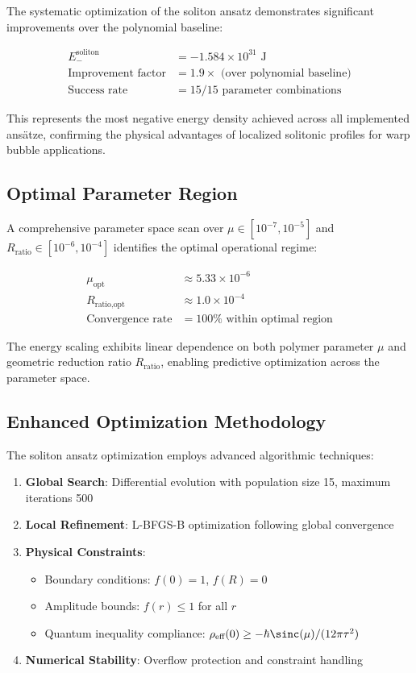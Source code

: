 \documentclass[12pt,a4paper]{article}
\begin{document}
The systematic optimization of the soliton ansatz demonstrates significant improvements over the polynomial baseline:

\begin{align}
E_{-}^{\text{soliton}} &= -1.584 \times 10^{31} \text{ J} \\
\text{Improvement factor} &= 1.9 \times \text{ (over polynomial baseline)} \\
\text{Success rate} &= 15/15 \text{ parameter combinations}
\end{align}

This represents the most negative energy density achieved across all implemented ansätze, confirming the physical advantages of localized solitonic profiles for warp bubble applications.

\subsection{Optimal Parameter Region}

A comprehensive parameter space scan over $\mu \in [10^{-7}, 10^{-5}]$ and $R_{\text{ratio}} \in [10^{-6}, 10^{-4}]$ identifies the optimal operational regime:

\begin{align}
\mu_{\text{opt}} &\approx 5.33 \times 10^{-6} \\
R_{\text{ratio,opt}} &\approx 1.0 \times 10^{-4} \\
\text{Convergence rate} &= 100\% \text{ within optimal region}
\end{align}

The energy scaling exhibits linear dependence on both polymer parameter $\mu$ and geometric reduction ratio $R_{\text{ratio}}$, enabling predictive optimization across the parameter space.

\subsection{Enhanced Optimization Methodology}

The soliton ansatz optimization employs advanced algorithmic techniques:

\begin{enumerate}
\item \textbf{Global Search}: Differential evolution with population size 15, maximum iterations 500
\item \textbf{Local Refinement}: L-BFGS-B optimization following global convergence
\item \textbf{Physical Constraints}:
   \begin{itemize}
   \item Boundary conditions: $f(0) = 1$, $f(R) = 0$
   \item Amplitude bounds: $f(r) \leq 1$ for all $r$
   \item Quantum inequality compliance: $\rho_{\text{eff}}(0) \geq -\hbar\sinc(\mu)/(12\pi\tau^2)$
   \end{itemize}
\item \textbf{Numerical Stability}: Overflow protection and constraint handling
\end{enumerate}
\end{document}
